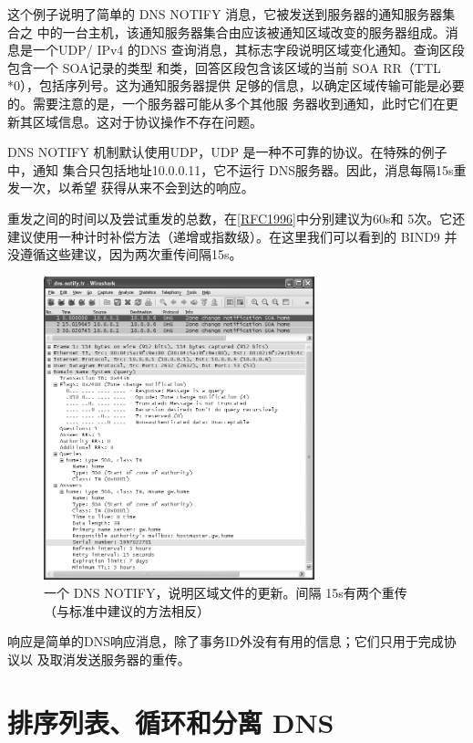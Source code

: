 这个例子说明了简单的 DNS NOTIFY 消息，它被发送到服务器的通知服务器集合之
中的一台主机，该通知服务器集合由应该被通知区域改变的服务器组成。消息是一个UDP/
IPv4 的DNS 查询消息，其标志字段说明区域变化通知。查询区段包含一个 SOA记录的类型
和类，回答区段包含该区域的当前 SOA RR（TTL *0），包括序列号。这为通知服务器提供
足够的信息，以确定区域传输可能是必要的。需要注意的是，一个服务器可能从多个其他服
务器收到通知，此时它们在更新其区域信息。这对于协议操作不存在问题。

DNS NOTIFY 机制默认使用UDP，UDP 是一种不可靠的协议。在特殊的例子中，通知
集合只包括地址10.0.0.11，它不运行 DNS服务器。因此，消息每隔15s重发一次，以希望
获得从来不会到达的响应。

\begin{tcolorbox}
    重发之间的时间以及尝试重发的总数，在\href{https://www.rfc-editor.org/rfc/rfc1996}{[RFC1996]}中分别建议为60s和
    5次。它还建议使用一种计时补偿方法（递增或指数级）。在这里我们可以看到的
    BIND9 并没遵循这些建议，因为两次重传间隔15s。
\end{tcolorbox}

\begin{figure}[!htb]
    \centering
	\includegraphics[width=0.7\textwidth]{imgs/11/11-23.png}
	\caption{一个 DNS NOTIFY，说明区域文件的更新。间隔 15s有两个重传（与标准中建议的方法相反）}
\end{figure}

响应是简单的DNS响应消息，除了事务ID外没有有用的信息；它们只用于完成协议以
及取消发送服务器的重传。

\section{排序列表、循环和分离 DNS}

